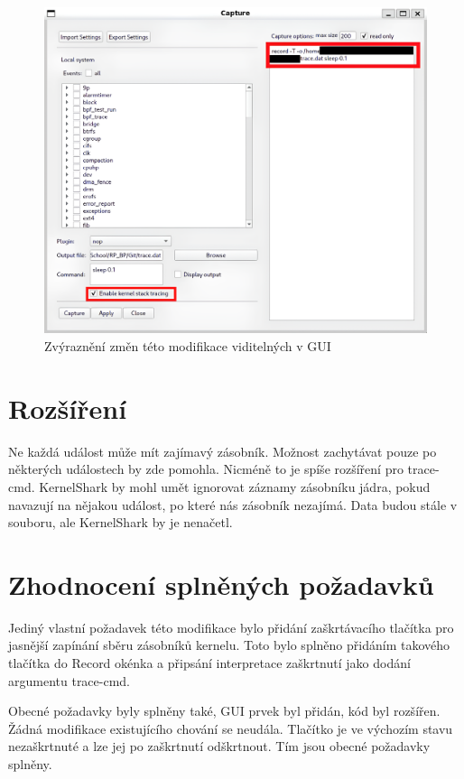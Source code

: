 \begin{figure}[p]\centering
    \includegraphics[width=140mm]{img/Modifikace/modif-record-kstack}
    \caption{Zvýraznění změn této modifikace viditelných v GUI}
    \label{obr01:record-kstack}
\end{figure}

\section{Rozšíření}

Ne každá událost může mít zajímavý zásobník. Možnost zachytávat pouze po některých událostech by zde pomohla. Nicméně to je spíše rozšíření pro trace-cmd. KernelShark by mohl umět ignorovat záznamy zásobníku jádra, pokud navazují na nějakou událost, po které nás zásobník nezajímá. Data budou stále v souboru, ale KernelShark by je nenačetl.

\section{Zhodnocení splněných požadavků}
Jediný vlastní požadavek této modifikace bylo přidání zaškrtávacího tlačítka pro jasnější zapínání sběru zásobníků kernelu. Toto bylo splněno přidáním takového tlačítka do Record okénka a připsání interpretace zaškrtnutí jako dodání argumentu trace-cmd.

Obecné požadavky byly splněny také, GUI prvek byl přidán, kód byl rozšířen. Žádná modifikace existujícího chování se neudála. Tlačítko je ve výchozím stavu nezaškrtnuté a lze jej po zaškrtnutí odškrtnout. Tím jsou obecné požadavky splněny.
